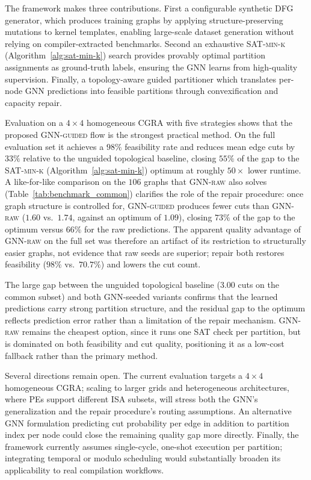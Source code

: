 \documentclass[runningheads]{llncs}
\begin{document}
The framework makes three contributions. First a configurable synthetic DFG generator, which produces training graphs by applying structure-preserving mutations to kernel templates, enabling large-scale dataset generation without relying on compiler-extracted benchmarks. Second an exhaustive \textsc{SAT-min-k} (Algorithm~\ref{alg:sat-min-k}) search provides provably optimal partition assignments as ground-truth labels, ensuring the GNN learns from high-quality supervision. Finally, a topology-aware guided partitioner which translates per-node GNN predictions into feasible partitions through convexification and capacity repair.

Evaluation on a $4 \times 4$ homogeneous CGRA with five strategies shows that the proposed \textsc{GNN-guided} flow is the strongest practical method. On the full evaluation set it achieves a $98\%$ feasibility rate and reduces mean edge cuts by $33\%$ relative to the unguided topological baseline, closing $55\%$ of the gap to the \textsc{SAT-min-k} (Algorithm~\ref{alg:sat-min-k}) optimum at roughly $50\times$ lower runtime. A like-for-like comparison on the $106$ graphs that \textsc{GNN-raw} also solves (Table~\ref{tab:benchmark_common}) clarifies the role of the repair procedure: once graph structure is controlled for, \textsc{GNN-guided} produces fewer cuts than \textsc{GNN-raw} ($1.60$ vs.\ $1.74$, against an optimum of $1.09$), closing $73\%$ of the gap to the optimum versus $66\%$ for the raw predictions. The apparent quality advantage of \textsc{GNN-raw} on the full set was therefore an artifact of its restriction to structurally easier graphs, not evidence that raw seeds are superior; repair both restores feasibility ($98\%$ vs.\ $70.7\%$) and lowers the cut count.

The large gap between the unguided topological baseline ($3.00$ cuts on the common subset) and both GNN-seeded variants confirms that the learned predictions carry strong partition structure, and the residual gap to the optimum reflects prediction error rather than a limitation of the repair mechanism. \textsc{GNN-raw} remains the cheapest option, since it runs one SAT check per partition, but is dominated on both feasibility and cut quality, positioning it as a low-cost fallback rather than the primary method.

Several directions remain open. The current evaluation targets a $4 \times 4$ homogeneous CGRA; scaling to larger grids and heterogeneous architectures, where PEs support different ISA subsets, will stress both the GNN's generalization and the repair procedure's routing assumptions. An alternative GNN formulation predicting cut probability per edge in addition to partition index per node could close the remaining quality gap more directly. Finally, the framework currently assumes single-cycle, one-shot execution per partition; integrating temporal or modulo scheduling would substantially broaden its applicability to real compilation workflows.
\end{document}
